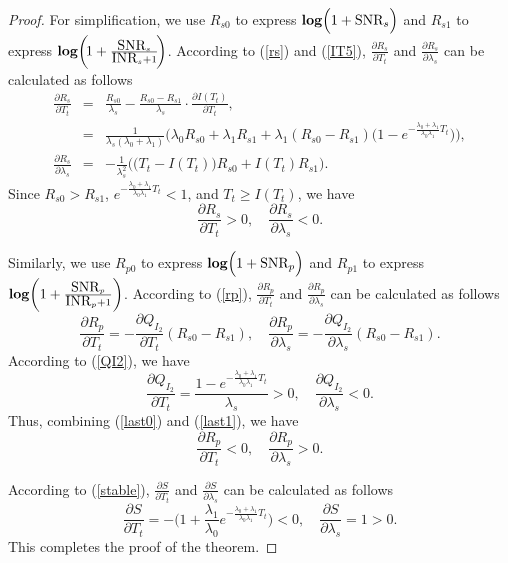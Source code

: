\documentclass[11pt,draftcls]{IEEEtran}{\onecolumn}
\begin{document}
\begin{proof}
For simplification, we use $R_{s0}$ to express
$\mbox{\textbf{log}}\Big(1+\mbox{SNR}_s\Big)$ and $R_{s1}$ to
express
$\mbox{\textbf{log}}\bigg(\!1+\frac{\mbox{SNR}_s}{\mbox{INR}_s+1}\!\bigg)$.
According to (\ref{rs}) and (\ref{IT5}),
$\frac{\partial{R_s}}{\partial{T_t}}$ and
$\frac{\partial{R_s}}{\partial{\lambda_s}}$ can be calculated as
follows
\begin{eqnarray}
\frac{\partial{R_s}}{\partial{T_t}}&=&\frac{R_{s0}}{\lambda_s}-
\frac{R_{s0}-R_{s1}}{\lambda_s}\cdot \frac{\partial{I(T_t)}}{\partial{T_t}},\nonumber\\
&=&\frac{1}{\lambda_s(\lambda_0+\lambda_1)}\bigg(\lambda_0R_{s0}+\lambda_1R_{s1}+\lambda_1(R_{s0}-R_{s1})
\Big(1-e^{-\frac{\lambda_0+\lambda_1}{\lambda_0\lambda_1}T_t}\Big)\bigg),\\
\frac{\partial{R_s}}{\partial{\lambda_s}}&=&-\frac{1}{\lambda^2_s}\bigg(\Big(T_t-I(T_t)\Big)R_{s0}+I(T_t)R_{s1}\bigg).
\end{eqnarray}
Since $R_{s0}>R_{s1}$,
$e^{-\frac{\lambda_0+\lambda_1}{\lambda_0\lambda_1}T_t}<1$, and
$T_t\ge I(T_t)$, we have
\begin{equation}
\frac{\partial{R_s}}{\partial{T_t}}>0,\quad \frac{\partial{R_s}}{\partial{\lambda_s}}<0.
\end{equation}

Similarly, we use $R_{p0}$ to express
$\mbox{\textbf{log}}\Big(1+\mbox{SNR}_p\Big)$ and $R_{p1}$ to
express
$\mbox{\textbf{log}}\bigg(1+\frac{\mbox{SNR}_p}{\mbox{INR}_p+1}\bigg)$.
According to (\ref{rp}), $\frac{\partial{R_p}}{\partial{T_t}}$ and
$\frac{\partial{R_p}}{\partial{\lambda_s}}$ can be calculated as
follows
\begin{equation}
\frac{\partial{R_p}}{\partial{T_t}}=-\frac{\partial{Q_{I_2}}}{\partial{T_t}}(R_{s0}-R_{s1}), \quad
\frac{\partial{R_p}}{\partial{\lambda_s}}=-\frac{\partial{Q_{I_2}}}{\partial{\lambda_s}}(R_{s0}-R_{s1}).\label{last0}
\end{equation}
According to (\ref{QI2}), we have
\begin{equation}
\frac{\partial{Q_{I_2}}}{\partial{T_t}}=\frac{1-e^{-\frac{\lambda_0+\lambda_1}{\lambda_0\lambda_1}T_t}}{\lambda_s}>0,
\quad \frac{\partial{Q_{I_2}}}{\partial{\lambda_s}}<0.\label{last1}
\end{equation}
Thus, combining (\ref{last0}) and (\ref{last1}), we have
\begin{equation}
\frac{\partial{R_p}}{\partial{T_t}}<0,
\quad \frac{\partial{R_p}}{\partial{\lambda_s}}>0.
\end{equation}

According to (\ref{stable}), $\frac{\partial{S}}{\partial{T_t}}$ and
$\frac{\partial{S}}{\partial{\lambda_s}}$ can be calculated as
follows
\begin{equation}
\frac{\partial{S}}{\partial{T_t}}=-\bigg(1+\frac{\lambda_1}{\lambda_0}e^{-\frac{\lambda_0+\lambda_1}{\lambda_0\lambda_1}T_t}\bigg)<0,
\quad \frac{\partial{S}}{\partial{\lambda_s}}=1>0.
\end{equation}
This completes the proof of the theorem.
\end{proof}
\end{document}
